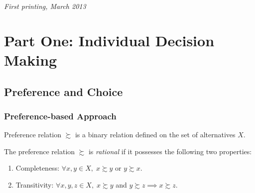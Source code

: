 \documentclass[11pt,fleqn]{book} %
\begin{document}
\noindent \textit{First printing, March 2013} %




\pagestyle{empty} %

\tableofcontents %

\cleardoublepage %

\pagestyle{fancy} %

\part{Part One: Individual Decision Making}



\chapter{Preference and Choice}

\section{Preference-based Approach}

\begin{definition}
	Preference relation $\succsim$ is a binary relation defined on the set of alternatives $X$.
\end{definition}

\begin{definition}[Rational]
	The preference relation $\succsim$ is \emph{rational} if it possesses the following two properties:
	\begin{enumerate}
		\item Completeness: $\forall x,y\in X,\;x\succsim y$ or $y\succsim x$.
		\item Transitivity: $\forall x,y,z\in X,\;x\succsim y$ and $y\succsim z \implies x\succsim z$.
	\end{enumerate}
\end{definition}
\end{document}

